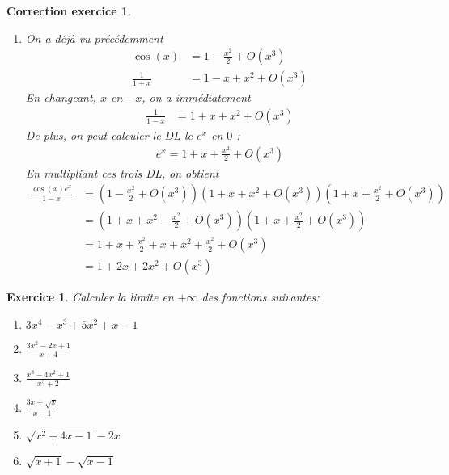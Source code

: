 \documentclass[12pt]{article}
\newtheorem{exercice}{\bf Exercice}
\newtheorem{correction}{\bf Correction exercice}
\newenvironment{exo}{
  \begin{exercice}\normalfont}{\end{exercice}
}
\newenvironment{cor}{
\begin{correction}\smallskip\normalfont}{\end{correction}
}
\begin{document}
\begin{cor}
\begin{enumerate}
\item On a déjà vu précédemment
  \begin{align*}
    \cos(x) 
    &= 1 - \frac{x^2}2 + O(x^3)
    \\
    \frac{1}{1+x} 
    &= 1 - x + x^2 + O(x^3)
  \end{align*}
  En changeant, $x$ en $-x$, on a immédiatement
  \begin{align*}
    \frac{1}{1-x} 
    &= 1 + x + x^2 + O(x^3)
  \end{align*}
  De plus, on peut calculer le DL le $e^x$ en $0$ :
  \begin{align*}
    e^x = 1 + x + \frac{x^2}{2} + O(x^3)
  \end{align*}
  En multipliant ces trois DL, on obtient
  \begin{align*}
    \frac{\cos(x)e^x}{1-x} 
    &= (1-\frac{x^2}{2} + O(x^3)) (1+x+x^2+O(x^3)) (1+x+\frac{x^2}2 + O(x^3))
    \\
    &= (1+x+x^2-\frac{x^2}{2}+O(x^3)) (1+x+\frac{x^2}2 + O(x^3))
    \\
    &= 1 + x + \frac{x^2}2 + x + x^2 + \frac{x^2}{2} + O(x^3)
    \\
    &= 1 + 2x + 2x^2 + O(x^3)
  \end{align*}
  
\end{enumerate}
\end{cor}
\color{black}
\fi



\begin{exo} Calculer la limite en $+\infty$ des fonctions suivantes:
\begin{multicols}{3}
\begin{enumerate}
\item $3x^4 - x^3 + 5x^2 + x - 1$
\item $\frac{3x^2-2x+1}{x+4}$
\item $\frac{x^3-4x^2+1}{x^5+2}$
\item $\frac{3x+\sqrt{x}}{x-1}$
\item $\sqrt{x^2+4x-1} - 2x$
\item $\sqrt{x+1} - \sqrt{x-1}$
\end{enumerate}
\end{multicols}
\end{exo}
\end{document}
